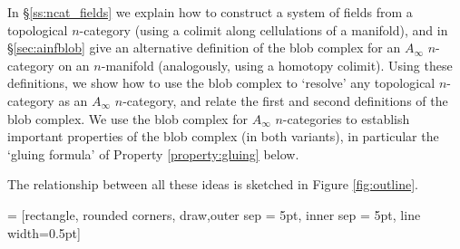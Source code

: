In \S \ref{ss:ncat_fields}  we explain how to construct a system of fields from a topological $n$-category (using a colimit along cellulations of a manifold), and in \S \ref{sec:ainfblob} give an alternative definition of the blob complex for an $A_\infty$ $n$-category on an $n$-manifold (analogously, using a homotopy colimit). Using these definitions, we show how to use the blob complex to `resolve' any topological $n$-category as an $A_\infty$ $n$-category, and relate the first and second definitions of the blob complex. We use the blob complex for $A_\infty$ $n$-categories to establish important properties of the blob complex (in both variants), in particular the `gluing formula' of Property \ref{property:gluing} below.

The relationship between all these ideas is sketched in Figure \ref{fig:outline}.


 = [rectangle, rounded corners, draw,outer sep = 5pt, inner sep = 5pt, line width=0.5pt]

